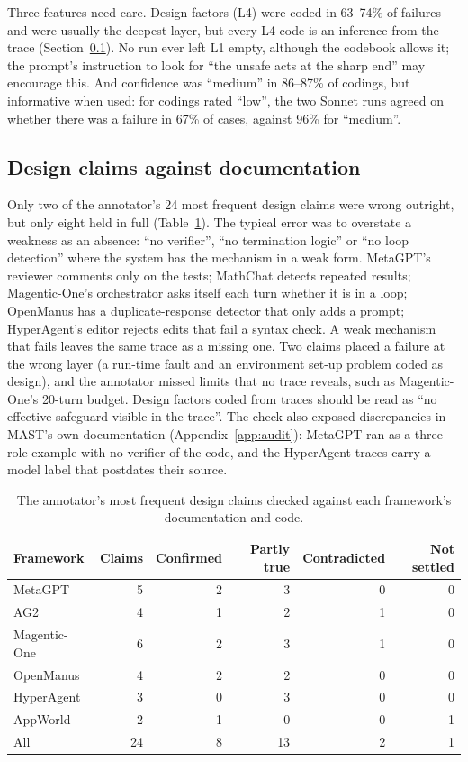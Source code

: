 \documentclass[10pt,a4paper]{article}
\begin{document}
Three features need care. Design factors (L4) were coded in 63--74\% of failures
and were usually the deepest layer, but every L4 code is an inference from the
trace (Section~\ref{sec:designcheck}). No run ever left L1 empty, although the
codebook allows it; the prompt's instruction to look for ``the unsafe acts at the
sharp end'' may encourage this. And confidence was ``medium'' in 86--87\% of
codings, but informative when used: for codings rated ``low'', the two Sonnet runs
agreed on whether there was a failure in 67\% of cases, against 96\% for
``medium''.

\subsection{Design claims against documentation}
\label{sec:designcheck}

Only two of the annotator's 24 most frequent design claims were wrong outright,
but only eight held in full (Table~\ref{tab:designcheck}). The typical error was
to overstate a weakness as an absence: ``no verifier'', ``no termination logic'' or
``no loop detection'' where the system has the mechanism in a weak form. MetaGPT's
reviewer comments only on the tests; MathChat detects repeated results;
Magentic-One's orchestrator asks itself each turn whether it is in a loop;
OpenManus has a duplicate-response detector that only adds a prompt; HyperAgent's
editor rejects edits that fail a syntax check. A weak mechanism that fails leaves
the same trace as a missing one. Two claims placed a failure at the wrong layer (a
run-time fault and an environment set-up problem coded as design), and the
annotator missed limits that no trace reveals, such as Magentic-One's 20-turn
budget. Design factors coded from traces should be read as ``no effective
safeguard visible in the trace''. The check also exposed discrepancies in MAST's
own documentation (Appendix~\ref{app:audit}): MetaGPT ran as a three-role example
with no verifier of the code, and the HyperAgent traces carry a model label that
postdates their source.

\begin{table}[tbp]
\centering
\caption{The annotator's most frequent design claims checked against each
framework's documentation and code.}
\label{tab:designcheck}
\small
\begin{tabular}{@{}lrrrrr@{}}
\toprule
Framework & Claims & Confirmed & Partly true & Contradicted & Not settled\\
\midrule
MetaGPT & 5 & 2 & 3 & 0 & 0\\
AG2 & 4 & 1 & 2 & 1 & 0\\
Magentic-One & 6 & 2 & 3 & 1 & 0\\
OpenManus & 4 & 2 & 2 & 0 & 0\\
HyperAgent & 3 & 0 & 3 & 0 & 0\\
AppWorld & 2 & 1 & 0 & 0 & 1\\
\midrule
All & 24 & 8 & 13 & 2 & 1\\
\bottomrule
\end{tabular}
\end{table}
\end{document}
